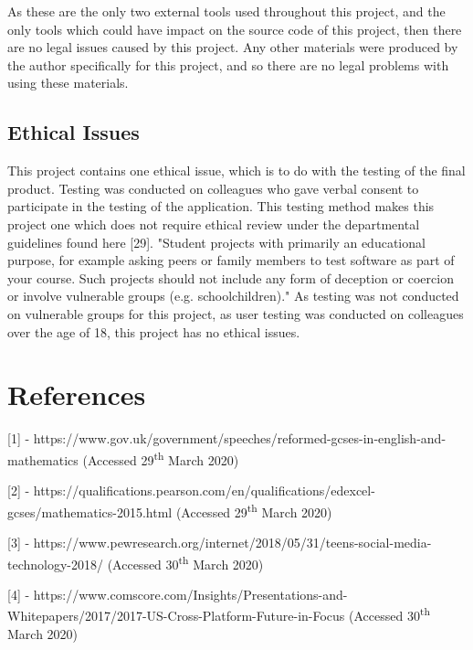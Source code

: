 \documentclass{article}
\begin{document}
As these are the only two external tools used throughout this project, and the only tools which could have impact on the source code of this project, then there are no legal issues caused by this project. Any other materials were produced by the author specifically for this project, and so there are no legal problems with using these materials. \par

\subsection{Ethical Issues}

This project contains one ethical issue, which is to do with the testing of the final product. Testing was conducted on colleagues who gave verbal consent to participate in the testing of the application. This testing method makes this project one which does not require ethical review under the departmental guidelines found here [29]. "Student projects with primarily an educational purpose, for example asking peers or family members to test software as part of your course. Such projects should not include any form of deception or coercion or involve vulnerable groups (e.g. schoolchildren)." As testing was not conducted on vulnerable groups for this project, as user testing was conducted on colleagues over the age of 18, this project has no ethical issues. 

\section{References}
\label{section:references}

[1] - https://www.gov.uk/government/speeches/reformed-gcses-in-english-and-mathematics (Accessed 29\textsuperscript{th} March 2020) \par

[2] - https://qualifications.pearson.com/en/qualifications/edexcel-gcses/mathematics-2015.html (Accessed 29\textsuperscript{th} March 2020) \par

[3] - https://www.pewresearch.org/internet/2018/05/31/teens-social-media-technology-2018/ (Accessed 30\textsuperscript{th} March 2020) \par

[4] - https://www.comscore.com/Insights/Presentations-and-Whitepapers/2017/2017-US-Cross-Platform-Future-in-Focus (Accessed 30\textsuperscript{th} March 2020) \par
\end{document}
